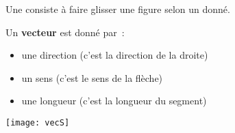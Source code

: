 

\begin{aconnaitre}
Une  consiste à faire glisser une figure selon un  donné.\\[0.5em]
\begin{minipage}[c]{0.58\linewidth}
Un \textbf{vecteur} est donné par :
\begin{itemize}
 \item une direction (c'est la direction de la droite)
 \item un sens (c'est le sens de la flèche)
 \item une longueur (c'est la longueur du segment)
 \end{itemize}
 \end{minipage} \hfill%
 \begin{minipage}[c]{0.38\linewidth}
 \begin{center} \texttt{[image: vecS]} \end{center}
 \end{minipage} \\
\end{aconnaitre}

